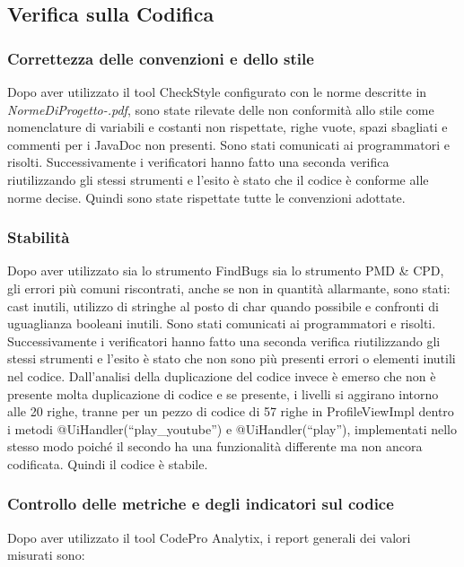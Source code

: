 \subsection{Verifica sulla Codifica}

\subsubsection*{Correttezza delle convenzioni e dello stile}
Dopo aver utilizzato il tool CheckStyle configurato con le norme descritte in
\emph{NormeDiProgetto-\versionenormeprogetto.pdf}, sono state rilevate delle non
conformit\`a allo stile come nomenclature di variabili e costanti non
rispettate, righe vuote, spazi sbagliati e commenti per i JavaDoc non presenti.
Sono stati comunicati ai programmatori e risolti. Successivamente i verificatori
hanno fatto una seconda verifica riutilizzando gli stessi strumenti e l'esito
\`e stato che il codice \`e conforme alle norme decise. Quindi sono state
rispettate tutte le convenzioni adottate.

\subsubsection*{Stabilit\`a}
Dopo aver utilizzato sia lo strumento FindBugs sia lo strumento PMD \& CPD, gli
errori pi\`u comuni riscontrati, anche se non in quantit\`a allarmante, sono
stati: cast inutili, utilizzo di stringhe al posto di char quando possibile
e confronti di uguaglianza booleani inutili. Sono stati
comunicati ai programmatori e risolti. Successivamente i verificatori hanno
fatto una seconda verifica riutilizzando gli stessi strumenti e l'esito \`e
stato che non sono pi\`u presenti errori o elementi inutili nel codice. 
Dall'analisi della duplicazione del
codice invece \`e emerso che non \`e presente molta duplicazione di codice e se
presente, i livelli si aggirano intorno alle 20 righe, tranne per un pezzo di
codice di 57 righe in ProfileViewImpl dentro i metodi @UiHandler(``play\_youtube'') e
@UiHandler(``play''), implementati nello stesso modo poich\'e il
secondo ha una funzionalit\`a differente ma non ancora codificata. Quindi
il codice \`e stabile.

\subsubsection*{Controllo delle metriche e degli indicatori sul codice}
Dopo aver utilizzato il tool CodePro Analytix, i report generali dei valori
misurati sono:

